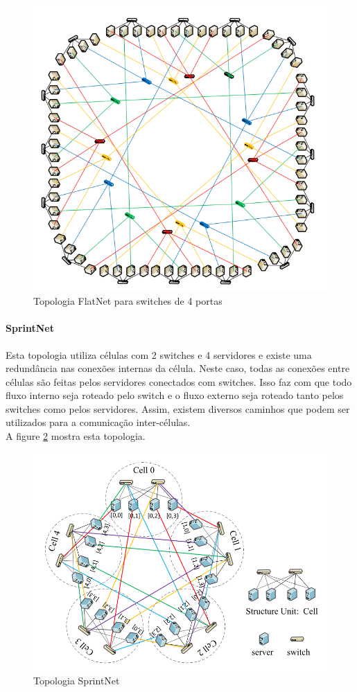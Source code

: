 \documentclass[12pt,a4paper]{report}
\begin{document}
\begin{figure}[H]
\centering
\includegraphics[width=.8\textwidth]{imagens/flatnet.png}
\caption{Topologia FlatNet para switches de 4 portas}
\label{flatnet}
\end{figure}

\paragraph{SprintNet}
Esta topologia utiliza células com 2 switches e 4 servidores e existe uma redundância nas conexões internas da célula. Neste caso, todas as conexões entre células são feitas pelos servidores conectados com switches. Isso faz com que todo fluxo interno seja roteado pelo switch e o fluxo externo seja roteado tanto pelos switches como pelos servidores. Assim, existem diversos caminhos que podem ser utilizados para a comunicação inter-células.\\

A figure \ref{sprintnet} mostra esta topologia.\\

\begin{figure}[H]
\centering
\includegraphics[width=.8\textwidth]{imagens/springnet.png}
\caption{Topologia SprintNet}
\label{sprintnet}
\end{figure}
\end{document}
